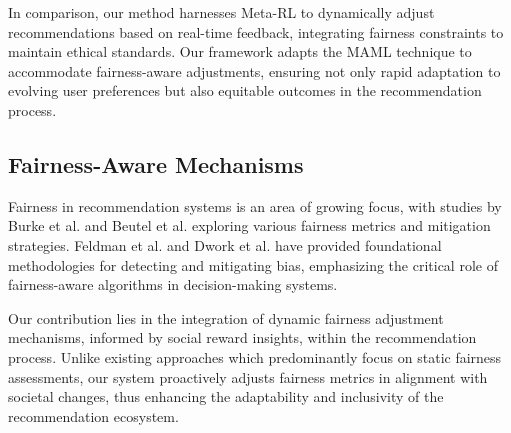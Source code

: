 In comparison, our method harnesses Meta-RL to dynamically adjust recommendations based on real-time feedback, integrating fairness constraints to maintain ethical standards. Our framework adapts the MAML technique to accommodate fairness-aware adjustments, ensuring not only rapid adaptation to evolving user preferences but also equitable outcomes in the recommendation process.

\subsection{Fairness-Aware Mechanisms}

Fairness in recommendation systems is an area of growing focus, with studies by Burke et al. \cite{burke2018balanced} and Beutel et al. \cite{beutel2019fairness} exploring various fairness metrics and mitigation strategies. Feldman et al. \cite{feldman2015certifying} and Dwork et al. \cite{dwork2012fairness} have provided foundational methodologies for detecting and mitigating bias, emphasizing the critical role of fairness-aware algorithms in decision-making systems.

Our contribution lies in the integration of dynamic fairness adjustment mechanisms, informed by social reward insights, within the recommendation process. Unlike existing approaches which predominantly focus on static fairness assessments, our system proactively adjusts fairness metrics in alignment with societal changes, thus enhancing the adaptability and inclusivity of the recommendation ecosystem.

